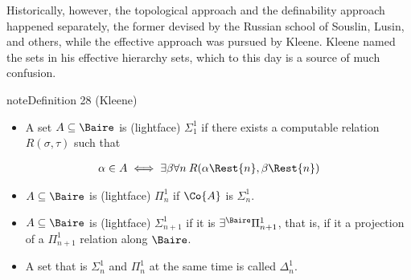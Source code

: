\documentclass[letterpaper,10pt,english]{jupyterBook}
\begin{document}
\sphinxAtStartPar
Historically, however, the topological approach and the definability approach happened separately, the former devised by the Russian school of Souslin, Lusin, and others, while the effective approach was pursued by Kleene. Kleene named the sets in his effective hierarchy  sets, which to this day is a source of much confusion.
\label{projective:def-analytical-hierarchy}
\begin{sphinxadmonition}{note}{Definition 28 (Kleene)}


\begin{itemize}
\item {} 
\sphinxAtStartPar
A set \(A \subseteq \Baire\) is (lightface) \(\Sigma^1_1\) if there exists a computable relation \(R(\sigma, \tau)\) such that

\end{itemize}
\begin{equation*}
\begin{split}
	\alpha \in A \iff \exists \beta \forall n \: R(\alpha\Rest{n},\beta\Rest{n})
\end{split}
\end{equation*}\begin{itemize}
\item {} 
\sphinxAtStartPar
\(A \subseteq \Baire\) is (lightface) \(\Pi^1_n\) if \(\Co{A}\) is \(\Sigma^1_n\).

\item {} 
\sphinxAtStartPar
\(A \subseteq \Baire\) is (lightface) \(\Sigma^1_{n+1}\) if it is \(\exists^{\Baire} \Pi^1_{n+1}\), that is, if it a projection of a \(\Pi^1_{n+1}\) relation along \(\Baire\).

\item {} 
\sphinxAtStartPar
A set that is \(\Sigma^1_n\) and \(\Pi^1_n\) at the same time is called \(\Delta^1_n\).

\end{itemize}
\end{sphinxadmonition}
\end{document}

